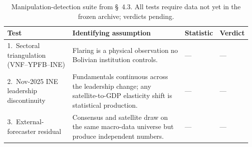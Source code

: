 \begin{table}[H]
\centering\small
\caption{Manipulation-detection suite from \S~4.3. All tests require data not yet in the frozen archive; verdicts pending.}
\label{tab:manipulation}
\begin{tabular}{p{3.2cm}p{6cm}p{2.2cm}p{2.2cm}}
\toprule
Test & Identifying assumption & Statistic & Verdict \\
\midrule
1.\ Sectoral triangulation (VNF--YPFB--INE) & Flaring is a physical observation no Bolivian institution controls. & --- & --- \\
\midrule
2.\ Nov-2025 INE leadership discontinuity & Fundamentals continuous across the leadership change; any satellite-to-GDP elasticity shift is statistical production. & --- & --- \\
\midrule
3.\ External-forecaster residual & Consensus and satellite draw on the same macro-data universe but produce independent numbers. & --- & --- \\
\bottomrule
\end{tabular}
\end{table}